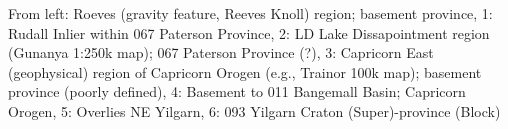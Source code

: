 From left: Roeves (gravity feature, Reeves Knoll) region; basement province, 1: Rudall Inlier within  067 Paterson Province, 2: LD Lake Dissapointment  region (Gunanya 1:250k map); 067 Paterson Province (?), 3: Capricorn East (geophysical) region of Capricorn Orogen (e.g., Trainor 100k map); basement province (poorly defined), 4: Basement to 011 Bangemall Basin; Capricorn Orogen, 5: Overlies NE Yilgarn, 6: 093 Yilgarn Craton (Super)-province (Block)
